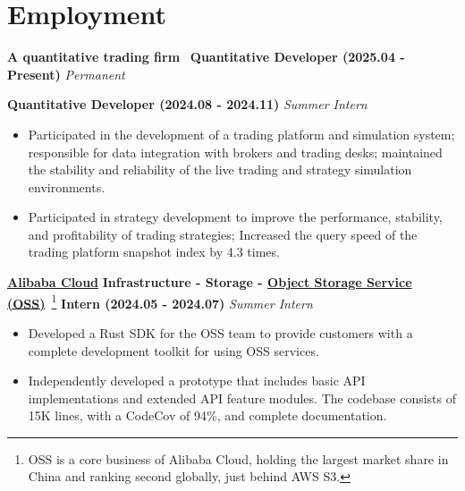 \ifdefined\english

    \section*{Employment}

    \noindent \textbf{A quantitative trading firm}~\footnotemark\label{fn:aum} \textbar{} \textbf{Quantitative
    Developer (2025.04 - Present)} \hfill \textsl{Permanent}

    \noindent {} \textbar{}
    \textbf{Quantitative Developer (2024.08 - 2024.11)} \hfill \textsl{Summer Intern}


    \begin{itemize}
        \item Participated in the development of a trading platform and simulation system; responsible for data
              integration with brokers and trading desks; maintained the stability and reliability of the live trading
              and strategy simulation environments.
        \item Participated in strategy development to improve the performance, stability, and profitability of trading
              strategies; Increased the query speed of the trading platform snapshot index by 4.3 times.
    \end{itemize}

    \noindent \textbf{\href{https://www.alibabacloud.com}{Alibaba Cloud}} \textbar{} \textbf{Infrastructure - Storage -
    \href{https://www.alibabacloud.com/en/product/object-storage-service}{Object Storage Service (OSS)}}~\footnote{OSS
    is a core business of Alibaba Cloud, holding the largest market share in China and ranking second globally, just
    behind AWS S3.} \textbar{} \textbf{Intern (2024.05 - 2024.07)} \hfill \textsl{Summer Intern}

    \begin{itemize}
        \item Developed a Rust SDK for the OSS team to provide customers with a complete development toolkit for using
              OSS services.
        \item Independently developed a prototype that includes basic API implementations and extended API feature
              modules. The codebase consists of 15K lines, with a CodeCov of 94\%, and complete documentation.
    \end{itemize}

